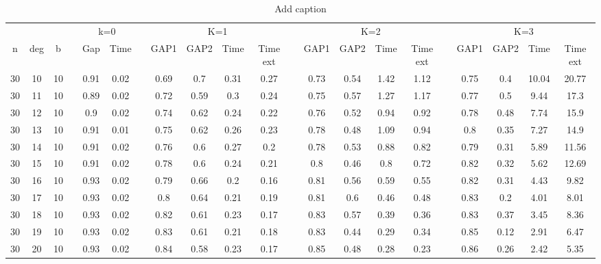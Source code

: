 \documentclass[11pt]{article}
\begin{document}
\begin{table}
	\centering
	\caption{Add caption}
	\begin{adjustbox}{width=\columnwidth, height=0.2\textheight, center}
		\begin{tabular}{ccccccccccccccccccccc}
			\toprule
			&       &       &       & \multicolumn{2}{c}{k=0} &       & \multicolumn{4}{c}{K=1}       &       & \multicolumn{4}{c}{K=2}       &       & \multicolumn{4}{c}{K=3} \\
			\cmidrule{5-6}\cmidrule{8-11}\cmidrule{13-16}\cmidrule{18-21}    n     & deg   & b     &       & Gap   & Time  &       & GAP1 & GAP2 & Time  & Time ext &       & GAP1 & GAP2 & Time  & Time ext &       & GAP1 & GAP2 & Time  & Time ext \\
			\midrule
			30    & 10    & 10    &       & 0.91  & 0.02  &       & 0.69  & 0.7   & 0.31  & 0.27  &       & 0.73  & 0.54  & 1.42  & 1.12  &       & 0.75  & 0.4   & 10.04 & 20.77 \\
			30    & 11    & 10    &       & 0.89  & 0.02  &       & 0.72  & 0.59  & 0.3   & 0.24  &       & 0.75  & 0.57  & 1.27  & 1.17  &       & 0.77  & 0.5   & 9.44  & 17.3 \\
			30    & 12    & 10    &       & 0.9   & 0.02  &       & 0.74  & 0.62  & 0.24  & 0.22  &       & 0.76  & 0.52  & 0.94  & 0.92  &       & 0.78  & 0.48  & 7.74  & 15.9 \\
			30    & 13    & 10    &       & 0.91  & 0.01  &       & 0.75  & 0.62  & 0.26  & 0.23  &       & 0.78  & 0.48  & 1.09  & 0.94  &       & 0.8   & 0.35  & 7.27  & 14.9 \\
			30    & 14    & 10    &       & 0.91  & 0.02  &       & 0.76  & 0.6   & 0.27  & 0.2   &       & 0.78  & 0.53  & 0.88  & 0.82  &       & 0.79  & 0.31  & 5.89  & 11.56 \\
			30    & 15    & 10    &       & 0.91  & 0.02  &       & 0.78  & 0.6   & 0.24  & 0.21  &       & 0.8   & 0.46  & 0.8   & 0.72  &       & 0.82  & 0.32  & 5.62  & 12.69 \\
			30    & 16    & 10    &       & 0.93  & 0.02  &       & 0.79  & 0.66  & 0.2   & 0.16  &       & 0.81  & 0.56  & 0.59  & 0.55  &       & 0.82  & 0.31  & 4.43  & 9.82 \\
			30    & 17    & 10    &       & 0.93  & 0.02  &       & 0.8   & 0.64  & 0.21  & 0.19  &       & 0.81  & 0.6   & 0.46  & 0.48  &       & 0.83  & 0.2   & 4.01  & 8.01 \\
			30    & 18    & 10    &       & 0.93  & 0.02  &       & 0.82  & 0.61  & 0.23  & 0.17  &       & 0.83  & 0.57  & 0.39  & 0.36  &       & 0.83  & 0.37  & 3.45  & 8.36 \\
			30    & 19    & 10    &       & 0.93  & 0.02  &       & 0.83  & 0.61  & 0.21  & 0.18  &       & 0.83  & 0.44  & 0.29  & 0.34  &       & 0.85  & 0.12  & 2.91  & 6.47 \\
			30    & 20    & 10    &       & 0.93  & 0.02  &       & 0.84  & 0.58  & 0.23  & 0.17  &       & 0.85  & 0.48  & 0.28  & 0.23  &       & 0.86  & 0.26  & 2.42  & 5.35 \\
			\bottomrule
		\end{tabular}%
	\end{adjustbox}
	

\end{table}
\end{document}
